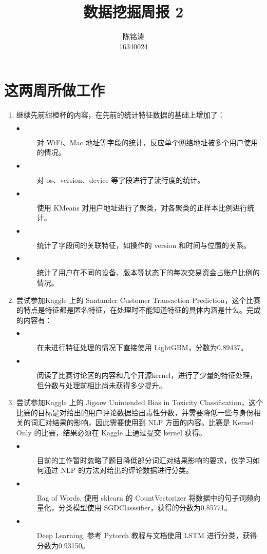 \documentclass[12pt]{article}
\begin{document}
\author{陈铭涛\\16340024}
\title{数据挖掘周报 2}
\maketitle

\medskip


\section{这两周所做工作}
\begin{enumerate}
    \item 继续先前甜橙杯的内容，在先前的统计特征数据的基础上增加了：
    \begin{description}
        \item[$\bullet$]对 WiFi、Mac 地址等字段的统计，反应单个网络地址被多个用户使用的情况。
        \item[$\bullet$]对 os、version、device 等字段进行了流行度的统计。
        \item[$\bullet$]使用 KMeans 对用户地址进行了聚类，对各聚类的正样本比例进行统计。
        \item[$\bullet$]统计了字段间的关联特征，如操作的 version 和时间与位置的关系。
        \item[$\bullet$]统计了用户在不同的设备、版本等状态下的每次交易资金占账户比例的情况。    
    \end{description}
    
    \item 尝试参加Kaggle 上的 Santander Customer Transaction Prediction，这个比赛的特点是特征都是匿名特征，在处理时不能知道特征的具体内涵是什么。完成的内容有：
    \begin{description}
        \item[$\bullet$]在未进行特征处理的情况下直接使用 LightGBM，分数为0.89437。
        \item[$\bullet$]阅读了比赛讨论区的内容和几个开源kernel，进行了少量的特征处理，但分数与处理前相比尚未获得多少提升。
    \end{description}
    \item 尝试参加Kaggle 上的 Jigsaw Unintended Bias in Toxicity Classification，这个比赛的目标是对给出的用户评论数据给出毒性分数，并需要降低一些与身份相关的词汇对结果的影响，因此需要使用到 NLP 方面的内容。比赛是 Kernel Only 的比赛，结果必须在 Kaggle 上通过提交 kernel 获得。
    \begin{description}
        \item[$\bullet$]目前的工作暂时忽略了题目降低部分词汇对结果影响的要求，仅学习如何通过 NLP 的方法对给出的评论数据进行分类。
        \item[$\bullet$]Bag of Words, 使用 sklearn 的 CountVectorizer 将数据中的句子词频向量化，分类模型使用 SGDClasssifier，获得的分数为0.85771。
        \item[$\bullet$]Deep Learning, 参考 Pytorch 教程与文档使用 LSTM 进行分类，获得分数为0.93150。

    \end{description}
\end{enumerate}
\end{document}
